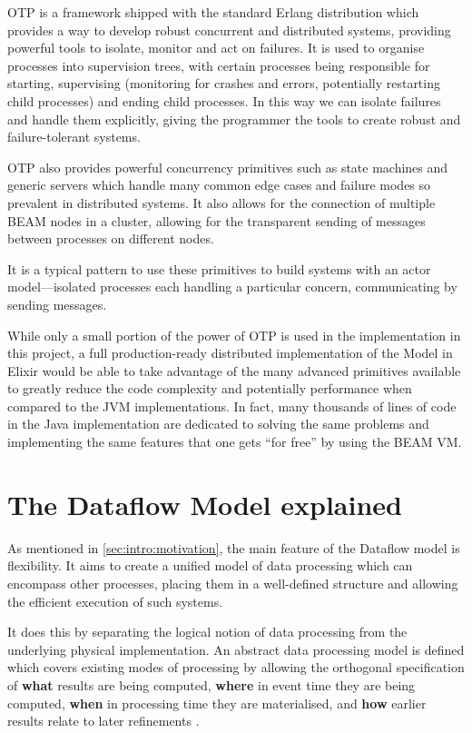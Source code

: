 OTP is a framework shipped with the standard Erlang distribution which provides a way to develop robust concurrent and distributed systems, providing powerful tools to isolate, monitor and act on failures.
It is used to organise processes into supervision trees, with certain processes being responsible for starting, supervising (monitoring for crashes and errors, potentially restarting child processes) and ending child processes.
In this way we can isolate failures and handle them explicitly, giving the programmer the tools to create robust and failure-tolerant systems.

OTP also provides powerful concurrency primitives such as state machines and generic servers which handle many common edge cases and failure modes so prevalent in distributed systems.
It also allows for the connection of multiple BEAM nodes in a cluster, allowing for the transparent sending of messages between processes on different nodes.

It is a typical pattern to use these primitives to build systems with an actor model---isolated processes each handling a particular concern, communicating by sending messages.

While only a small portion of the power of OTP is used in the implementation in this project, a full production-ready distributed implementation of the Model in Elixir would be able to take advantage of the many advanced primitives available to greatly reduce the code complexity and potentially performance when compared to the JVM implementations.
In fact, many thousands of lines of code in the Java implementation are dedicated to solving the same problems and implementing the same features that one gets ``for free'' by using the BEAM VM.

\section{The Dataflow Model explained}\label{sec:prep:dataflow}

As mentioned in \cref{sec:intro:motivation}, the main feature of the Dataflow model is flexibility.
It aims to create a unified model of data processing which can encompass other processes, placing them in a well-defined structure and allowing the efficient execution of such systems.

It does this by separating the logical notion of data processing from the underlying physical implementation.
An abstract data processing model is defined which covers existing modes of processing by allowing the orthogonal specification of \textbf{what} results are being computed, \textbf{where} in event time they are being computed, \textbf{when} in processing time they are materialised, and \textbf{how} earlier results relate to later refinements \cite[p.~1793]{Akidau:2015}.

